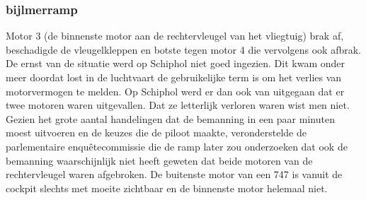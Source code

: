 \subsubsection{bijlmerramp}
Motor 3 (de binnenste motor aan de rechtervleugel van het vliegtuig) brak af, beschadigde de vleugelkleppen en botste tegen motor 4 die vervolgens ook afbrak.
De ernst van de situatie werd op Schiphol niet goed ingezien. Dit kwam onder meer doordat lost in de luchtvaart de gebruikelijke term is om het verlies van motorvermogen te melden. Op Schiphol werd er dan ook van uitgegaan dat er twee motoren waren uitgevallen. Dat ze letterlijk verloren waren wist men niet. Gezien het grote aantal handelingen dat de bemanning in een paar minuten moest uitvoeren en de keuzes die de piloot maakte, veronderstelde de parlementaire enquêtecommissie die de ramp later zou onderzoeken dat ook de bemanning waarschijnlijk niet heeft geweten dat beide motoren van de rechtervleugel waren afgebroken. De buitenste motor van een 747 is vanuit de cockpit slechts met moeite zichtbaar en de binnenste motor helemaal niet.

